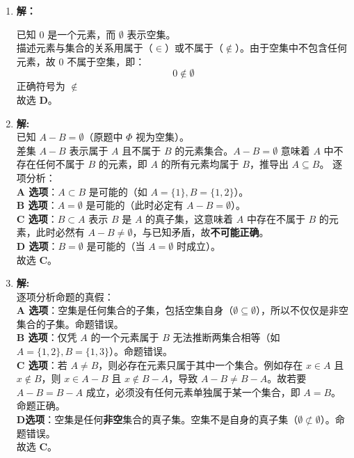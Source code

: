 \begin{enumerate}
	题目要求选出错误的命题，因此正确答案是 \textbf{C}。
	
	\item \textbf{解：}
	
	已知 $0$ 是一个元素，而 $\emptyset$ 表示空集。\\
	描述元素与集合的关系用属于（$\in$）或不属于（$\notin$）。由于空集中不包含任何元素，故 $0$ 不属于空集，即：
	\[ 0 \notin \emptyset \]正确符号为 $\notin$\\
	故选 \textbf{D}。
	
	\item \textbf{解:}\\
	已知 $A - B = \emptyset$（原题中 $\Phi$ 视为空集）。\\
	差集 $A - B$ 表示属于 $A$ 且不属于 $B$ 的元素集合。$A - B = \emptyset$ 意味着 $A$ 中不存在任何不属于 $B$ 的元素，即 $A$ 的所有元素均属于 $B$，推导出 $A \subseteq B$。
	逐项分析：\\
		\textbf{A 选项}：$A \subset B$ 是可能的（如 $A=\{1\}, B=\{1, 2\}$）。\\
		\textbf{B 选项}：$A = \emptyset$ 是可能的（此时必定有 $A-B=\emptyset$）。\\
		\textbf{C 选项}：$B \subset A$ 表示 $B$ 是 $A$ 的真子集，这意味着 $A$ 中存在不属于 $B$ 的元素，此时必然有 $A - B \neq \emptyset$，与已知矛盾，故\textbf{不可能正确}。\\
		\textbf{D 选项}：$B = \emptyset$ 是可能的（当 $A=\emptyset$ 时成立）。\\

	故选 \textbf{C}。
	
	\item \textbf{解:}\\
	逐项分析命题的真假：\\
		\textbf{A 选项}：空集是任何集合的子集，包括空集自身（$\emptyset \subseteq \emptyset$），所以不仅仅是非空集合的子集。命题错误。\\
		\textbf{B 选项}：仅凭 $A$ 的一个元素属于 $B$ 无法推断两集合相等（如 $A=\{1, 2\}, B=\{1, 3\}$）。命题错误。\\
		\textbf{C 选项}：若 $A \neq B$，则必存在元素只属于其中一个集合。例如存在 $x \in A$ 且 $x \notin B$，则 $x \in A-B$ 且 $x \notin B-A$，导致 $A-B \neq B-A$。故若要 $A-B = B-A$ 成立，必须没有任何元素单独属于某一个集合，即 $A = B$。命题正确。\\
		\textbf{D选项}：空集是任何\textbf{非空}集合的真子集。空集不是自身的真子集（$\emptyset \not\subset \emptyset$）。命题错误。\\
	故选 \textbf{C}。
	

\end{enumerate}
